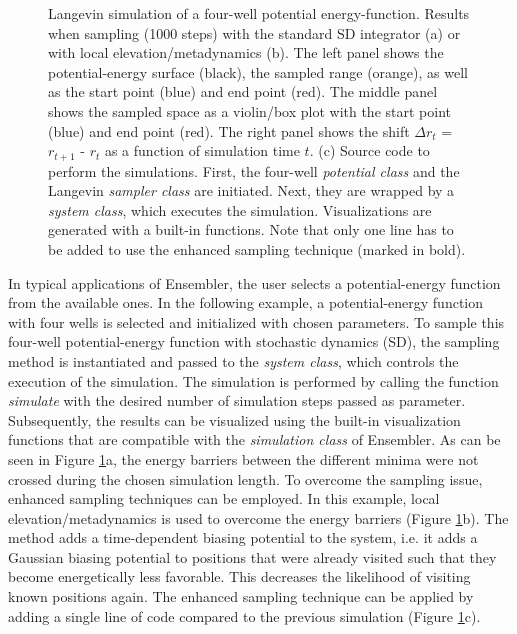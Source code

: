 \begin{figure}[H]
\begin{subfigure}{\textwidth}
	\end{subfigure}
\caption{Langevin simulation of a four-well potential energy-function. Results when sampling (1000 steps) with the standard SD integrator (a) or with local elevation\cite{Huber1994}/metadynamics\cite{Laio2002} (b). The left panel shows the potential-energy surface (black), the sampled range (orange), as well as the start point (blue) and end point (red). The middle panel shows the sampled space as a violin/box plot with the start point (blue) and end point (red). The right panel shows the shift $\Delta r_t$ = $r_{t+1}$ - $r_t$ as a function of simulation time $t$.
	(c) Source code to perform the simulations. First, the four-well \textit{potential class} and the Langevin \textit{sampler class} are initiated. Next, they are wrapped by a \textit{system class}, which executes the simulation. Visualizations are generated with a built-in functions. Note that only one line has to be added to use the enhanced sampling technique (marked in bold).}
\label{fig:code_example_simulations}
\end{figure}

In typical applications of Ensembler, the user selects a potential-energy function from the available ones. In the following example, a potential-energy function with four wells is selected and initialized with chosen parameters. 
To sample this four-well potential-energy function with stochastic dynamics (SD),\cite{Brunger1984} the sampling method is instantiated and passed to the \textit{system class}, which controls the execution of the simulation. 
The simulation is performed by calling the function \textit{simulate} with the desired number of simulation steps passed as parameter. 
Subsequently, the results can be visualized using the built-in visualization functions that are compatible with the \textit{simulation class} of Ensembler.  
As can be seen in Figure \ref{fig:code_example_simulations}a, the energy barriers between the different minima were not crossed during the chosen simulation length. 
To overcome the sampling issue, enhanced sampling techniques can be employed.\cite{Pohorille2010} 
In this example, local elevation\cite{Huber1994}/metadynamics\cite{Laio2002} is used to overcome the energy barriers (Figure \ref{fig:code_example_simulations}b).
The method adds a time-dependent biasing potential to the system, i.e. it adds a Gaussian biasing potential to positions that were already visited such that they become energetically less favorable. This decreases the likelihood of visiting known positions again. 
The enhanced sampling technique can be applied by adding a single line of code compared to the previous simulation (Figure \ref{fig:code_example_simulations}c).

